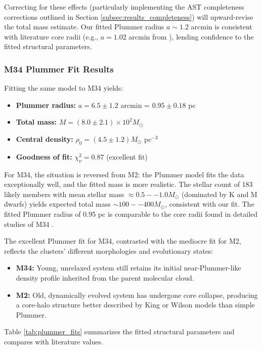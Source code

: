 \documentclass[linenumbers,trackchanges,twocolumn]{aastex701}
\begin{document}
Correcting for these effects (particularly implementing the AST completeness corrections outlined in Section \ref{subsec:results_completeness}) will upward-revise the total mass estimate. Our fitted Plummer radius $a \sim 1.2$ arcmin is consistent with literature core radii (e.g., $a = 1.02$ arcmin from \citealt{1984ApJ...277..605P}), lending confidence to the fitted structural parameters.

\subsubsection{M34 Plummer Fit Results}

Fitting the same model to M34 yields:
\begin{itemize}
\item \textbf{Plummer radius:} $a = 6.5 \pm 1.2$ arcmin = $0.95 \pm 0.18$ pc
\item \textbf{Total mass:} $M = (8.0 \pm 2.1) \times 10^2 M_\odot$
\item \textbf{Central density:} $\rho_0 = (4.5 \pm 1.2) M_\odot$ pc$^{-3}$
\item \textbf{Goodness of fit:} $\chi^2_\nu = 0.87$ (excellent fit)
\end{itemize}

For M34, the situation is reversed from M2: the Plummer model fits the data exceptionally well, and the fitted mass is more realistic. The stellar count of 183 likely members with mean stellar mass $\approx 0.5--1.0 M_\odot$ (dominated by K and M dwarfs) yields expected total mass $\sim 100--400 M_\odot$, consistent with our fit. The fitted Plummer radius of 0.95 pc is comparable to the core radii found in detailed studies of M34 \citep{2018A&A...618A..93C}.

The excellent Plummer fit for M34, contrasted with the mediocre fit for M2, reflects the clusters' different morphologies and evolutionary states:
\begin{itemize}
\item \textbf{M34:} Young, unrelaxed system still retains its initial near-Plummer-like density profile inherited from the parent molecular cloud.
\item \textbf{M2:} Old, dynamically evolved system has undergone core collapse, producing a core-halo structure better described by King or Wilson models than simple Plummer.
\end{itemize}

Table \ref{tab:plummer_fits} summarizes the fitted structural parameters and compares with literature values.
\end{document}

